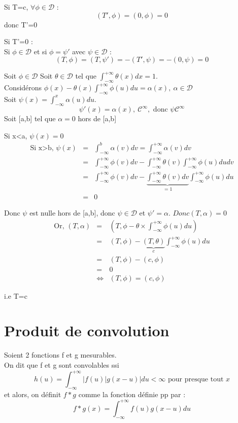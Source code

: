 \documentclass{article}
\begin{document}
\begin{dem}
Si T=c, $\forall \phi \in \mathcal{D}$ : \[(T',\phi)=(0,\phi)=0\] donc T'=0

Si T'=0 : \\
Si $\phi\in\mathcal{D}$ et si $\phi=\psi'$ avec $\psi\in\mathcal{D}$ :
\[(T,\phi)=(T,\psi')=-(T',\psi)=-(0,\psi)=0\]

\bigskip
Soit $\phi\in\mathcal{D}$
Soit $\theta\in\mathcal{D}$ tel que $\int_{-\infty}^{+\infty} \theta(x) dx=1$. \\
Considérons $\phi(x)-\theta(x)\int_{-\infty}^{+\infty} \phi(u) du = \alpha(x),\ \alpha\in\mathcal{D}$ \\
Soit $\psi(x)=\int_{-\infty}^x \alpha(u) du$.
\[\psi'(x)=\alpha(x),\ \mathcal{C}^{\infty}, \text{ donc } \psi \mathcal{C}^{\infty}\]
Soit [a,b] tel que $\alpha=0$ hors de [a,b]

Si x<a, $\psi(x)=0$
\begin{eqnarray*}
\text{Si x>b, } \psi(x)&=& \int_{-\infty}^b \alpha(v) dv = \int_{-\infty}^{+\infty} \alpha(v) dv \\
&=& \int_{-\infty}^{+\infty} \phi(v) dv - \int_{-\infty}^{+\infty} \theta(v) \int_{-\infty}^{+\infty} \phi(u) du dv \\
&=& \int_{-\infty}^{+\infty} \phi(v) dv - \underbrace{\int_{-\infty}^{+\infty}\theta(v) dv}_{=1} \int_{-\infty}^{+\infty} \phi(u) du \\
&=& 0
\end{eqnarray*}

Donc $\psi$ est nulle hors de [a,b], donc $\psi \in \mathcal{D}$ et $\psi'=\alpha$. $Donc (T,\alpha)=0$
\begin{eqnarray*}
\text{Or, } (T, \alpha)&=&(T, \phi-\theta\times\int_{-\infty}^{+\infty} \phi(u) du) \\
&=& (T,\phi) -\underbrace{(T,\theta)}_{c} \int_{-\infty}^{+\infty} \phi(u) du \\
&=& (T,\phi)-(c,\phi) \\
&=& 0
\\
&\Leftrightarrow& (T,\phi)=(c,\phi)
\end{eqnarray*}

i.e T=c
\end{dem}

\section{Produit de convolution}
\begin{rap}
Soient 2 fonctions f et g mesurables. \\
On dit que f et g sont convolables ssi \[h(u)=\int_{-\infty}^{+\infty} |f(u)|g(x-u)| du < \infty \text{ pour presque tout }x\]
et alors, on définit $f*g$ comme la fonction définie pp par : \[f*g(x)=\int_{-\infty}^{+\infty} f(u) g(x-u) du\]
\end{rap}
\end{document}
